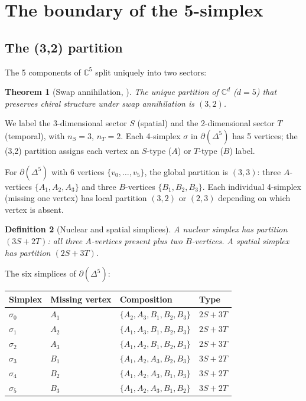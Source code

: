 \documentclass[12pt,a4paper]{article}
\newtheorem{theorem}{Theorem}[section]
\newtheorem{definition}[theorem]{Definition}
\newcommand{\CC}{\mathbb{C}}
\newcommand{\nS}{n_S}
\newcommand{\nT}{n_T}
\begin{document}
\section{The boundary of the 5-simplex}
\label{sec:boundary}

\subsection{The (3,2) partition}

The 5 components of $\CC^5$ split uniquely into two sectors:

\begin{theorem}[Swap annihilation, {\cite{uniqueness}}]
\label{thm:swap}
The unique partition of $\CC^d$ ($d = 5$) that preserves
chiral structure under swap annihilation is $(3,2)$.
\end{theorem}

We label the 3-dimensional sector $S$ (spatial) and the
2-dimensional sector $T$ (temporal), with $\nS = 3$, $\nT = 2$.
Each 4-simplex $\sigma$ in $\partial(\Delta^5)$ has 5 vertices;
the (3,2) partition assigns each vertex an $S$-type ($A$) or
$T$-type ($B$) label.

For $\partial(\Delta^5)$ with 6 vertices $\{v_0,\ldots,v_5\}$,
the global partition is $(3,3)$: three $A$-vertices
$\{A_1,A_2,A_3\}$ and three $B$-vertices $\{B_1,B_2,B_3\}$.
Each individual 4-simplex (missing one vertex) has local
partition $(3,2)$ or $(2,3)$ depending on which vertex is absent.

\begin{definition}[Nuclear and spatial simplices]
A \emph{nuclear simplex} has partition $(3S+2T)$:
all three $A$-vertices present plus two $B$-vertices.
A \emph{spatial simplex} has partition $(2S+3T)$.
\end{definition}

The six simplices of $\partial(\Delta^5)$:
\begin{center}
\begin{tabular}{llll}
\toprule
Simplex & Missing vertex & Composition & Type \\
\midrule
$\sigma_0$ & $A_1$ & $\{A_2,A_3,B_1,B_2,B_3\}$ & $2S+3T$ \\
$\sigma_1$ & $A_2$ & $\{A_1,A_3,B_1,B_2,B_3\}$ & $2S+3T$ \\
$\sigma_2$ & $A_3$ & $\{A_1,A_2,B_1,B_2,B_3\}$ & $2S+3T$ \\
$\sigma_3$ & $B_1$ & $\{A_1,A_2,A_3,B_2,B_3\}$ & $3S+2T$ \\
$\sigma_4$ & $B_2$ & $\{A_1,A_2,A_3,B_1,B_3\}$ & $3S+2T$ \\
$\sigma_5$ & $B_3$ & $\{A_1,A_2,A_3,B_1,B_2\}$ & $3S+2T$ \\
\bottomrule
\end{tabular}
\end{center}
\end{document}
